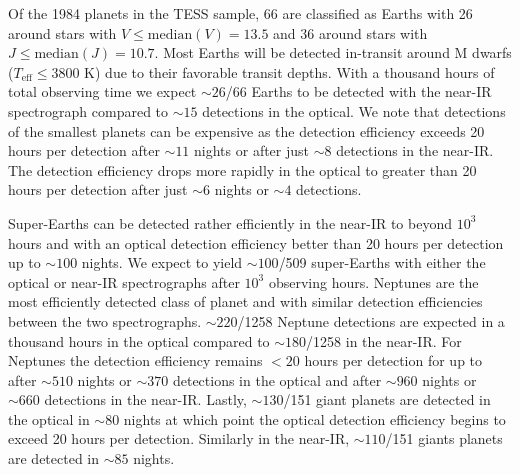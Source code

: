 Of the 1984 planets in the 
TESS sample, 66 are classified as Earths with 26 around stars with
$V \leq \text{median}(V) = 13.5$ and 36 around stars with $J \leq \text{median}(J)=10.7$. Most Earths will
be detected in-transit around M dwarfs ($T_{\text{eff}} \leq 3800$ K) due to their favorable transit depths.
With a thousand hours of total observing time we expect $\sim 26$/66 Earths to be detected with the 
near-IR spectrograph compared to $\sim 15$ detections in the optical. We note that detections of the smallest
planets can be expensive as the detection efficiency exceeds 20 hours per detection
after $\sim 11$ nights or after just $\sim 8$ detections in the near-IR. The detection efficiency
drops more rapidly in the optical to greater than 20 hours per detection after just $\sim 6$ nights or
$\sim 4$ detections.

Super-Earths can be detected rather efficiently in the near-IR to beyond $10^3$ hours and with an optical
detection efficiency better than 20 hours per detection up to $\sim 100$ nights.
We expect to yield $\sim 100$/509 super-Earths with either the optical or near-IR
spectrographs after $10^3$ observing hours.
Neptunes are the most efficiently detected class of planet and with similar detection efficiencies between the two
spectrographs. $\sim 220$/1258 Neptune detections are expected in a thousand hours in the optical
compared to $\sim 180$/1258 in the near-IR. For Neptunes
the detection efficiency remains $<20$ hours per detection for up to 
after $\sim 510$ nights or $\sim 370$ detections in the optical and after $\sim 960$ nights or $\sim 660$ detections
in the near-IR. Lastly, $\sim 130$/151 giant planets are detected in the optical in $\sim 80$ nights at which point the
optical detection efficiency begins to exceed 20 hours per detection. Similarly in the near-IR, $\sim 110$/151 giants planets
are detected in $\sim 85$ nights.

